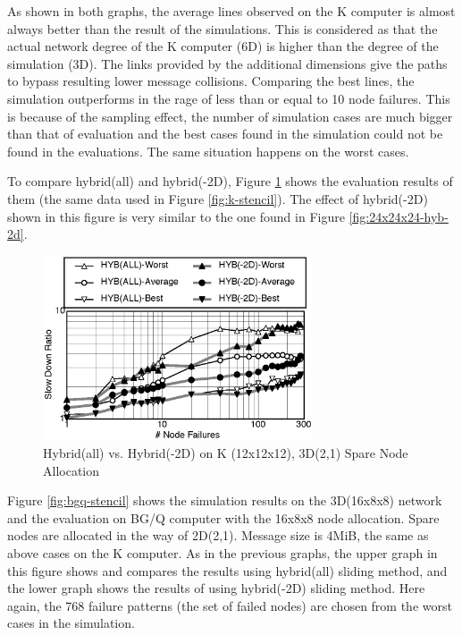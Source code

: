 \documentclass[Afour,times,sagev]{sagej}
\begin{document}
As shown in both graphs, the average lines observed on the K computer
is almost always better than the result of the simulations. This is
considered as that the actual network degree of the K computer (6D) is
higher than the degree of the simulation (3D). The links provided by
the additional dimensions give the paths to bypass resulting lower
message collisions. Comparing the best lines, the simulation
outperforms in the rage of less than or equal to 10 node
failures. This is because of the sampling effect, the number of
simulation cases are much bigger than that of evaluation and the best
cases found in the simulation could not be found in the
evaluations. The same situation happens on the worst cases.

To compare hybrid(all) and hybrid(-2D), Figure \ref{fig:k-comparison}
shows the evaluation results of them (the same data used in Figure
\ref{fig:k-stencil}). The effect of hybrid(-2D) shown in this figure
is very similar to the one found in Figure \ref{fig:24x24x24-hyb-2d}. 

\begin{figure}[ht]
\centering
\includegraphics[width=80mm]{Figs/K-comparison.eps}
  \caption{Hybrid(all) vs. Hybrid(-2D) on K (12x12x12), 3D(2,1) Spare Node
    Allocation}
  \label{fig:k-comparison}
\end{figure}

Figure \ref{fig:bgq-stencil} shows the simulation results on the
3D(16x8x8) network and the evaluation on BG/Q computer with the 16x8x8
node allocation. Spare nodes are allocated in the way of
2D(2,1). Message size is 4MiB, the same as above cases on the K
computer. As in the previous graphs, the upper graph in this figure
shows and compares the results using hybrid(all) sliding method, and
the lower graph shows the results of using hybrid(-2D) sliding
method. Here again, the 768 failure patterns (the set of failed nodes)
are chosen from the worst cases in the simulation.
\end{document}
